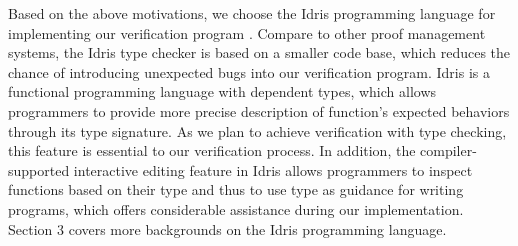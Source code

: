 Based on the above motivations, we choose the Idris programming language for implementing our verification program \cite{idris}. Compare to other proof management systems, the Idris type checker is based on a smaller code base, which reduces the chance of introducing unexpected bugs into our verification program.
Idris is a functional programming language with dependent types, which allows programmers to provide more precise description of function's expected behaviors through its type signature. As we plan to achieve verification with type checking, this feature is essential to our verification process. In addition, the compiler-supported interactive editing feature in Idris allows programmers to inspect functions based on their type and thus to use type as guidance for writing programs, which offers considerable assistance during our implementation. Section 3 covers more backgrounds on the Idris programming language. 



